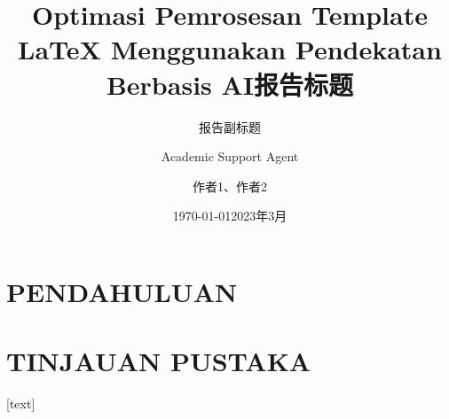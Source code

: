 \documentclass{beamer}
\title{Optimasi Pemrosesan Template LaTeX Menggunakan Pendekatan Berbasis AI}
\author{Academic Support Agent}
\date{\today}
\begin{document}
\maketitle

\begin{abstract}

\end{abstract}

\chapter{PENDAHULUAN}


\chapter{TINJAUAN PUSTAKA}


\usepackage{amsfonts,amsmath,oldgerm}
\usepackage{xeCJK}

\usepackage[backend=bibtex,sorting=none]{biblatex}

[text]   %


\newcommand{\testcolor}[1]{\colorbox{#1}{\textcolor{#1}{test}}~\texttt{#1}}



\newcommand{\hrefcol}[2]{\textcolor{cyan}{\href{#1}{#2}}}

\title{报告标题}
\subtitle{报告副标题}
\author{作者1、作者2}
\date{2023年3月}
\end{document}
